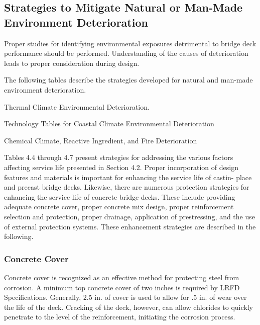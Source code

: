 \subsection{Strategies to Mitigate Natural or Man-Made Environment Deterioration}
\label{subsec:strategies-mitigate-hazard}
Proper studies for identifying environmental exposures detrimental to bridge deck performance should be
performed. Understanding of the causes of deterioration leads to proper consideration during design.

The following tables describe the strategies developed for natural and man-made environment deterioration.

\begin{table}
  \caption{Thermal Climate Environmental Deterioration.}
  \label{tab:thermal-climate-deterioration}
\end{table}

\begin{table}
  \caption{Technology Tables for Coastal Climate Environmental Deterioration}
  \label{tab:Coastal-climate-deterioration}
\end{table}

\begin{table}
  \caption{Chemical Climate, Reactive Ingredient, and Fire Deterioration}
  \label{tab:chemical-climate-deterioration}
\end{table}

Tables 4.4 through 4.7 present strategies for addressing the various factors affecting service life presented in
Section 4.2. Proper incorporation of design features and materials is important for enhancing the service life of castin-
place and precast bridge decks. Likewise, there are numerous protection strategies for enhancing the service life of
concrete bridge decks. These include providing adequate concrete cover, proper concrete mix design, proper
reinforcement selection and protection, proper drainage, application of prestressing, and the use of external protection
systems. These enhancement strategies are described in the following.

\subsubsection{Concrete Cover}
Concrete cover is recognized as an effective method for protecting steel from corrosion. A minimum top concrete
cover of two inches is required by LRFD Specifications. Generally, 2.5 in. of cover is used to allow for .5 in. of wear over the life of the deck. Cracking of the deck, however, can allow chlorides to quickly penetrate to the level of the
reinforcement, initiating the corrosion process.

